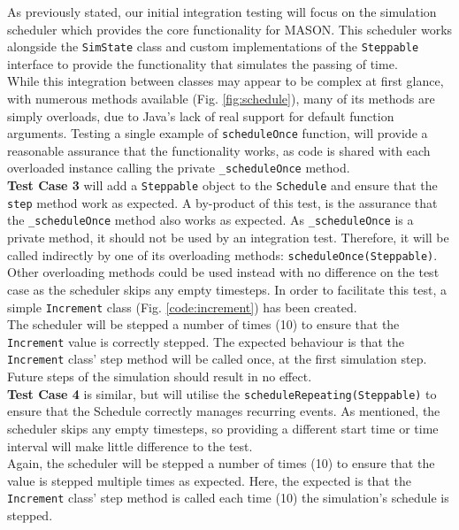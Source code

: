\documentclass[11pt]{article}
\begin{document}
As previously stated, our initial integration testing will focus on the simulation scheduler which provides the core functionality for MASON.
This scheduler works alongside the \texttt{SimState} class and custom implementations of the \texttt{Steppable} interface to provide the functionality that simulates the passing of time.
\\

While this integration between classes may appear to be complex at first glance, with numerous methods available (Fig. \ref{fig:schedule}), many of its methods are simply overloads,  due to Java's lack of real support for default function arguments.
Testing a single example of \texttt{scheduleOnce} function, will provide a reasonable assurance that the functionality works, as code is shared with each overloaded instance calling the private \texttt{\_scheduleOnce} method.
\\

\textbf{Test Case 3} will add a \texttt{Steppable} object to the \texttt{Schedule} and ensure that the \texttt{step} method work as expected.
A by-product of this test, is the assurance that the \texttt{\_scheduleOnce} method also works as expected.
As \texttt{\_scheduleOnce} is a private method, it should not be used by an integration test.
Therefore, it will be called indirectly by one of its overloading methods: \texttt{scheduleOnce(Steppable)}.
Other overloading methods could be used instead with no difference on the test case as the scheduler skips any empty timesteps.
In order to facilitate this test, a simple \texttt{Increment} class (Fig. \ref{code:increment}) has been created.
\\

The scheduler will be stepped a number of times (10) to ensure that the \texttt{Increment} value is correctly stepped.
The expected behaviour is that the \texttt{Increment} class' step method will be called once, at the first simulation step.
Future steps of the simulation should result in no effect.
\\

\textbf{Test Case 4} is similar, but will utilise the \texttt{scheduleRepeating(Steppable)} to ensure that the Schedule correctly manages recurring events.
As mentioned, the scheduler skips any empty timesteps, so providing a different start time or time interval will make little difference to the test.
\\

Again, the scheduler will be stepped a number of times (10) to ensure that the value is stepped multiple times as expected.
Here, the expected is that the \texttt{Increment} class' step method is called each time (10) the simulation's schedule is stepped.
\end{document}
